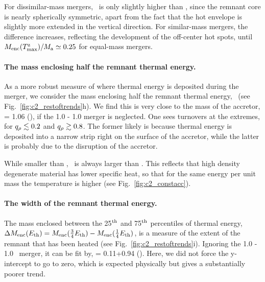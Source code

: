 For dissimilar-mass mergers, \zMencTmax\ is only slightly higher than \MencTmax, since the remnant core is nearly spherically symmetric, apart from the fact that the hot envelope is slightly more extended in the vertical direction.  For similar-mass mergers, the difference increases, reflecting the development of the off-center hot spots, until $\zMencTmax/\Ma\simeq0.25$ for equal-mass mergers.

\paragraph{The mass enclosing half the remnant thermal energy.}  As a more robust measure of where thermal energy is deposited during the merger, we consider the mass enclosing half the remnant thermal energy, \MEthermfifty\ (see Fig.~\ref{fig:c2_restoftrends}h).  We find this is very close to the mass of the accretor,
\eqbegin
\frac{\MEthermfifty}{\Ma}= 1.06
\qquad(),
\eqend
if the 1.0 - 1.0 {\Msun} merger is neglected.  One sees turnovers at the extremes, for $\qrho\lesssim0.2$ and $\qrho\gtrsim0.8$.  The former likely is because thermal energy is deposited into a narrow strip right on the surface of the accretor, while the latter is probably due to the disruption of the accretor.

While smaller than \MMfifty, \MEthermfifty\ is always larger than \MencTmax.  This reflects that high density degenerate material has lower specific heat, so that for the same energy per unit mass the temperature is higher (see Fig.~\ref{fig:c2_constacc}).  

\paragraph{The width of the remnant thermal energy.}  The mass enclosed between the 25$^{\rm th}$ and 75$^{\rm th}$ percentiles of thermal energy, $\MEthermthick = M_{\rm enc}(\frac{3}{4}E_\mathrm{th}) - M_{\rm enc}(\frac{1}{4}E_\mathrm{th})$, is a measure of the extent of the remnant that has been heated (see Fig.~\ref{fig:c2_restoftrends}i).  Ignoring the 1.0 - 1.0 \Msun\ merger, it can be fit by,
\eqbegin
\frac{\MEthermthick}{\Ma} = 0.11+0.94\qrho
\qquad().
\eqend
Here, we did not force the y-intercept to go to zero, which is expected physically but gives a substantially poorer trend.


